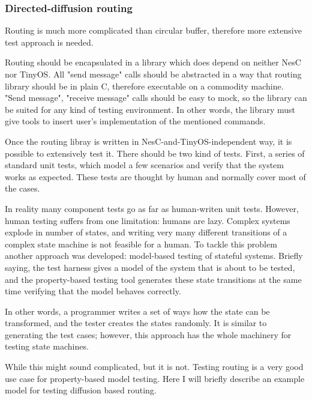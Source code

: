 \documentclass[english,11pt]{article}
\numberwithin{equation}{section}
\begin{document}
\subsubsection{Directed-diffusion routing}

Routing is much more complicated than circular buffer, therefore more extensive
test approach is needed.

Routing should be encapsulated in a library which does depend on neither NesC
nor TinyOS. All "send message" calls should be abstracted in a way that routing
library should be in plain C, therefore executable on a commodity machine.
"Send message", "receive message" calls should be easy to mock, so the library
can be suited for any kind of testing environment. In other words, the library
must give tools to insert user's implementation of the mentioned commands.

Once the routing libray is written in NesC-and-TinyOS-independent way, it is
possible to extensively test it. There should be two kind of tests. First, a
series of standard unit tests, which model a few scenarios and verify that the
system works as expected. These tests are thought by human and normally cover
most of the cases.

In reality many component tests go as far as human-writen unit tests. However,
human testing suffers from one limitation: humans are lazy. Complex systems
explode in number of states, and writing very many different transitions of a
complex state machine is not feasible for a human. To tackle this problem
another approach was developed: model-based testing of stateful
systems\cite{model-testing}. Briefly saying, the test harness gives a model of
the system that is about to be tested, and the property-based testing tool
generates these state transitions at the same time verifying that the model
behaves correctly.

In other words, a programmer writes a set of ways how the state can be
transformed, and the tester creates the states randomly. It is similar to
generating the test cases; however, this approach has the whole machinery for 
testing state machines.

While this might sound complicated, but it is not. Testing routing is a very
good use case for property-based model testing. Here I will briefly describe an
example model for testing diffusion based routing.
\end{document}
